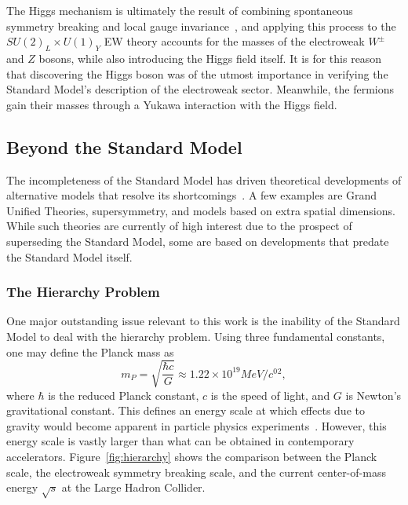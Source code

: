 The Higgs mechanism is ultimately the result of combining spontaneous symmetry breaking and local gauge invariance~\cite{Higgs:1964ia}, and applying this process to the $SU(2)_L\times U(1)_Y$ EW theory accounts for the masses of the electroweak $W^\pm$ and $Z$ bosons, while also introducing the Higgs field itself.
It is for this reason that discovering the Higgs boson was of the utmost importance in verifying the Standard Model's description of the electroweak sector.
Meanwhile, the fermions gain their masses through a Yukawa interaction with the Higgs field.

\subsection{Beyond the Standard Model}
\label{subsec:BSM}

The incompleteness of the Standard Model has driven theoretical developments of alternative models that resolve its shortcomings~\cite{2010arXiv1005.1676L}.
A few examples are Grand Unified Theories, supersymmetry, and models based on extra spatial dimensions.
While such theories are currently of high interest due to the prospect of superseding the Standard Model, some are based on developments that predate the Standard Model itself.

\subsubsection{The Hierarchy Problem}

One major outstanding issue relevant to this work is the inability of the Standard Model to deal with the hierarchy problem.
Using three fundamental constants, one may define the Planck mass as
\begin{equation}
  m_P=\sqrt{\frac{\hbar c}{G}}\approx1.22\times10^{19}\unit{MeV/\clight^2},
\end{equation}
where $\hbar$ is the reduced Planck constant, $c$ is the speed of light, and $G$ is Newton's gravitational constant.
This defines an energy scale at which effects due to gravity would become apparent in particle physics experiments~\cite{QFTNutshell}.
However, this energy scale is vastly larger than what can be obtained in contemporary accelerators.
Figure~\ref{fig:hierarchy} shows the comparison between the Planck scale, the electroweak symmetry breaking scale, and the current center-of-mass energy $\sqrt{s}$ at the Large Hadron Collider.

